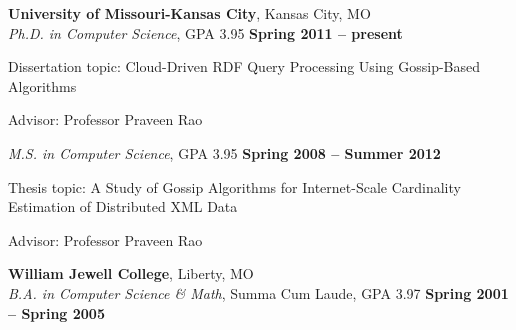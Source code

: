 \documentclass[margin,line]{resume}
\begin{document}
\begin{resume}
    \textbf{University of Missouri-Kansas City}, Kansas City, MO\\
    \textsl{Ph.D. in Computer Science}, GPA 3.95 \hfill \textbf{Spring 2011 -- present}\vspace{-3mm}\\\vspace{-1mm}%
    \vspace{1mm}
    \begin{list3}
        \item Dissertation topic: Cloud-Driven RDF Query Processing Using Gossip-Based Algorithms
        \item Advisor:  Professor Praveen Rao
    \end{list3}\vspace{-1.5mm}
    \textsl{M.S. in Computer Science}, GPA 3.95 \hfill \textbf{Spring 2008 -- Summer 2012}\vspace{-3mm}\\\vspace{-1mm}%
    \vspace{1mm}
    \begin{list3}
        \item Thesis topic: A Study of Gossip Algorithms for Internet-Scale Cardinality Estimation of Distributed XML Data
        \item Advisor:  Professor Praveen Rao
    \end{list3}\vspace{-1.5mm}
    \textbf{William Jewell College}, Liberty, MO\\
    \textsl{B.A. in Computer Science \& Math}, Summa Cum Laude, GPA 3.97 \hfill \textbf{Spring 2001 -- Spring 2005}\vspace{-3mm}\\\vspace{-1mm}%


\end{resume}
\end{document}
